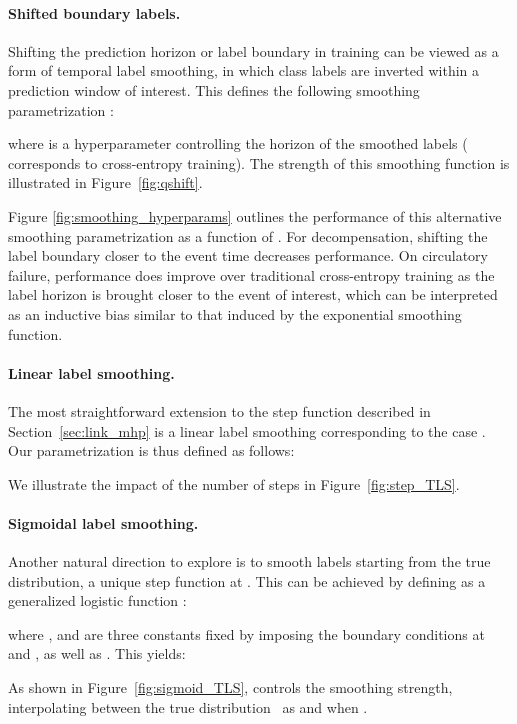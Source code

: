 \documentclass[nohyperref]{article}
\begin{document}
{
\paragraph{Shifted boundary labels.}
Shifting the prediction horizon or label boundary in training can be viewed as a form of temporal label smoothing, in which class labels are inverted within a prediction window of interest. This defines the following smoothing parametrization :

where  is a hyperparameter controlling the horizon of the smoothed labels ( corresponds to cross-entropy training). The strength of this smoothing function is illustrated in Figure~\ref{fig:qshift}.

Figure \ref{fig:smoothing_hyperparams} outlines the performance of this alternative smoothing parametrization as a function of . For decompensation, shifting the label boundary closer to the event time decreases performance. On circulatory failure, performance does improve over traditional cross-entropy training as the label horizon is brought closer to the event of interest, which can be interpreted as an inductive bias similar to that induced by the exponential smoothing function.

}

\paragraph{Linear label smoothing.}
The most straightforward extension to the step function  described in Section~\ref{sec:link_mhp} is a linear label smoothing corresponding to the case .\\
Our parametrization  is thus defined as follows:

We illustrate the impact of the number of steps  in Figure~\ref{fig:step_TLS}.

\paragraph{Sigmoidal label smoothing.}
Another natural direction to explore is to smooth labels starting from the true distribution, a unique step function at . This can be achieved by defining  as a generalized logistic function \citep{richards1959flexible}:



where ,  and  are three constants fixed by imposing the boundary conditions at  and , as well as . This yields:


As shown in Figure~\ref{fig:sigmoid_TLS},  controls the smoothing strength, interpolating between the true distribution \ as  and  when .
\end{document}
